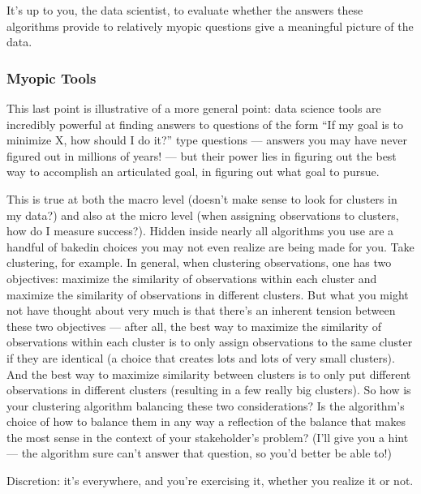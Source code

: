 \documentclass[letterpaper,10pt,english]{jupyterBook}
\begin{document}
\sphinxAtStartPar
It’s up to you, the data scientist, to evaluate whether the answers these algorithms provide to relatively myopic questions give a meaningful picture of the data.


\subsubsection{Myopic Tools}
\label{\detokenize{30_questions/15_answering_exploratory_questions:myopic-tools}}
\sphinxAtStartPar
This last point is illustrative of a more general point: data science tools are incredibly powerful at finding answers to questions of the form “If my goal is to minimize X, how should I do it?” type questions — answers you may have never figured out in millions of years! — but their power lies in figuring out the best way to accomplish an articulated goal,  in figuring out what goal to pursue.

\sphinxAtStartPar
This is true at both the macro level (doesn’t make sense to look for clusters in my data?) and also at the micro level (when assigning observations to clusters, how do I measure success?). Hidden inside nearly all algorithms you use are a handful of baked\sphinxhyphen{}in choices you may not even realize are being made for you. Take clustering, for example. In general, when clustering observations, one has two objectives: maximize the similarity of observations within each cluster and maximize the similarity of observations in different clusters. But what you might not have thought about very much is that there’s an inherent tension between these two objectives — after all, the best way to maximize the similarity of observations within each cluster is to only assign observations to the same cluster if they are identical (a choice that creates lots and lots of very small clusters). And the best way to maximize similarity between clusters is to only put  different observations in different clusters (resulting in a few really big clusters). So how is your clustering algorithm balancing these two considerations? Is the algorithm’s choice of how to balance them in any way a reflection of the balance that makes the most sense in the context of your stakeholder’s problem? (I’ll give you a hint — the algorithm sure can’t answer that question, so you’d better be able to!)

\sphinxAtStartPar
Discretion: it’s everywhere, and you’re exercising it, whether you realize it or not.
\end{document}
